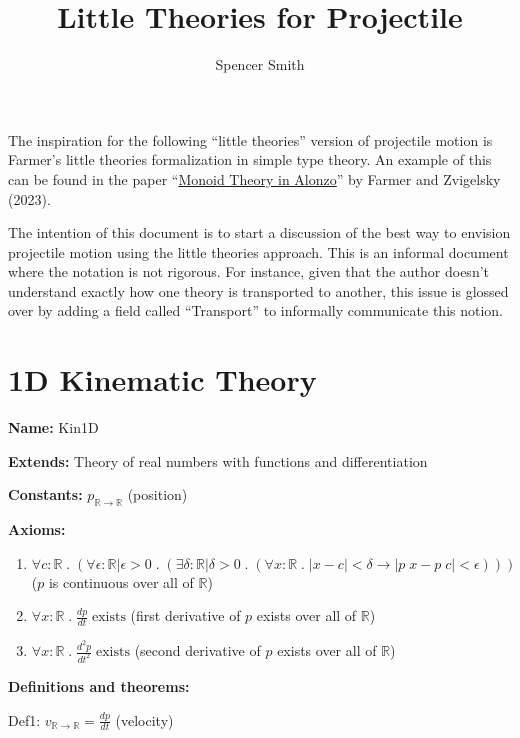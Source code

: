 \documentclass{article}
\title{Little Theories for Projectile}
\author{Spencer Smith}
\begin{document}
\maketitle

The inspiration for the following ``little theories'' version of projectile
motion is Farmer's little theories formalization in simple type theory.  An
example of this can be found in the paper
``\href{https://imps.mcmaster.ca/doc/monoids.pdf} {Monoid Theory in Alonzo}'' by
Farmer and Zvigelsky (2023).

The intention of this document is to start a discussion of the best way to
envision projectile motion using the little theories approach.  This is an
informal document where the notation is not rigorous.  For instance, given that
the author doesn't understand exactly how one theory is transported to another,
this issue is glossed over by adding a field called ``Transport'' to informally
communicate this notion.

\section{1D Kinematic Theory}

\noindent \textbf{Name:} Kin1D

\noindent \textbf{Extends:} Theory of real numbers with functions and differentiation

\noindent \textbf{Constants:} $p_{\mathbb{R} \rightarrow \mathbb{R}}$ (position)

\noindent \textbf{Axioms:}

\begin{enumerate}
    \item $\forall c: \mathbb{R} \; . \; (\forall \epsilon: \mathbb{R} |
    \epsilon > 0 \; . \; (\exists \delta : \mathbb{R} | \delta > 0 \; . \;
    (\forall x: \mathbb{R} \; . \; | x - c | < \delta \rightarrow |p \; x - p \;
    c | < \epsilon)))$ ($p$ is continuous over all of $\mathbb{R}$)
    \item $\forall x: \mathbb{R} \; . \; \frac{dp} {dt} \; \text{exists}$ (first derivative of $p$ exists over all of $\mathbb{R}$)
    \item $\forall x: \mathbb{R} \; . \; \frac{d^2 p} {d t^2} \; \text{exists}$ (second derivative of $p$ exists over all of $\mathbb{R}$)
\end{enumerate}

\noindent \textbf{Definitions and theorems:}

Def1: $v_{\mathbb{R} \rightarrow \mathbb{R}} = \frac{dp}{dt}$ (velocity)
\end{document}

